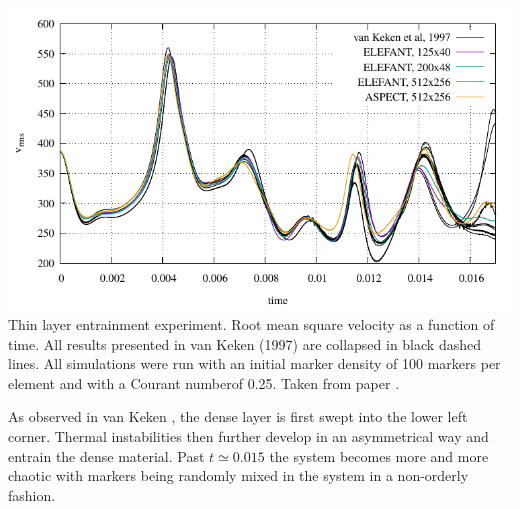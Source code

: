 \begin{center}
\includegraphics[width=0.5\linewidth]{images/benchmark_thinlayer/vrms/vrms.pdf}\\
{\captionfont Thin layer entrainment experiment. Root mean square velocity as a function of time.
All results presented in van Keken \etal (1997) are collapsed in black dashed lines. 
All simulations were run with an initial marker density of 100 markers per element and with 
a Courant numberof 0.25. Taken from \elefant paper \cite{thie14}.}
\end{center}

As observed in van Keken \etal, the dense layer is first swept 
into the lower left corner. Thermal instabilities then further develop in an asymmetrical way 
and entrain the dense material. Past $t\simeq 0.015$ the system becomes more 
and more chaotic with markers being randomly mixed in the system in a non-orderly fashion.

